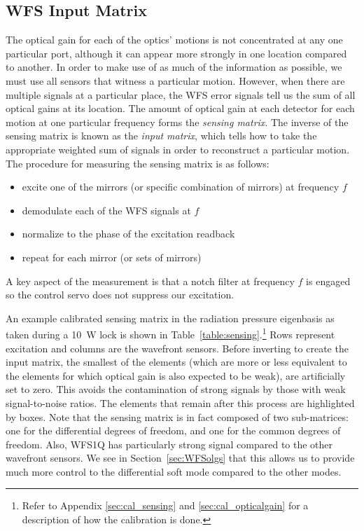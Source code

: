 \subsection{WFS Input Matrix}
\label{sec:inputmatrix}
The optical gain for each of the optics' motions is not concentrated
at any one particular port, although it can appear more strongly in
one location compared to another. In order to make use of as much of
the information as possible, we must use all sensors that witness a
particular motion. However, when there are multiple signals at a
particular place, the WFS error signals tell us the sum of all optical
gains at its location. The amount of optical gain at each detector for
each motion at one particular frequency forms the \emph{sensing
  matrix}. The inverse of the sensing matrix is known as the
\emph{input matrix}, which tells how to take the appropriate weighted
sum of signals in order to reconstruct a particular motion. The
procedure for measuring the sensing matrix is as follows:
\begin{itemize}
\item excite one of the mirrors (or specific combination of mirrors)
  at frequency $f$ \vspace{-10pt}
\item demodulate each of the WFS signals at $f$ \vspace{-10pt}
\item normalize to the phase of the excitation readback \vspace{-10pt}
\item repeat for each mirror (or sets of mirrors)
\end{itemize}
A key aspect of the measurement is that a notch filter at frequency
$f$ is engaged so the control servo does not suppress our excitation.

An example calibrated sensing matrix in the radiation pressure
eigenbasis as taken during a 10~W lock is shown in
Table~\ref{table:sensing}.\footnote{Refer to Appendix
  \ref{sec:cal_sensing} and \ref{sec:cal_opticalgain} for a
  description of how the calibration is done.} Rows represent
excitation and columns are the wavefront sensors. Before inverting to
create the input matrix, the smallest of the elements (which are more
or less equivalent to the elements for which optical gain is also
expected to be weak), are artificially set to zero. This avoids the
contamination of strong signals by those with weak signal-to-noise
ratios. The elements that remain after this process are highlighted by
boxes. Note that the sensing matrix is in fact composed of two
sub-matrices: one for the differential degrees of freedom, and one for
the common degrees of freedom. Also, WFS1Q has particularly strong
signal compared to the other wavefront sensors. We see in
Section~\ref{sec:WFSolgs} that this allows us to provide much more
control to the differential soft mode compared to the other modes.

